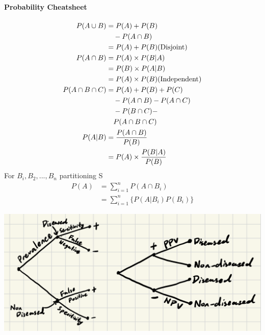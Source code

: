 \begin{itemize}
\paragraph{Probability Cheatsheet}
\begin{align*}
	P(A\cup B)&=P(A)+P(B)\\
			  &\quad-P(A\cap B)\\
			  &=P(A)+P(B) \textup{(Disjoint)}\\
	P(A\cap B)&=P(A)\times P(B|A)\\
			  &=P(B)\times P(A|B)\\
			  &=P(A)\times P(B)\textup{(Independent)}\\
	P(A\cap B\cap C)&=P(A)+P(B)+P(C)\\
					&\quad-P(A\cap B)-P(A\cap C)\\
					&\quad-P(B\cap C)-\\
					&\quad P(A\cap B\cap C)\\
	P(A|B)&=\frac{P(A\cap B)}{P(B)}\\
		  &=P(A)\times \frac{P(B|A)}{P(B)}
\end{align*}
For $B_i,B_2,...,B_n$ partitioning S\\
\begin{align*}
	P(A)&=\sum_{i=1}^nP(A\cap B_i)\\
	    &=\sum_{i=1}^n\{P(A|B_i)P(B_i)\}
\end{align*}
\begin{Figure}
	\includegraphics[width=0.893\linewidth]{diseaseProbabilities.png}
\end{Figure}
\end{itemize}